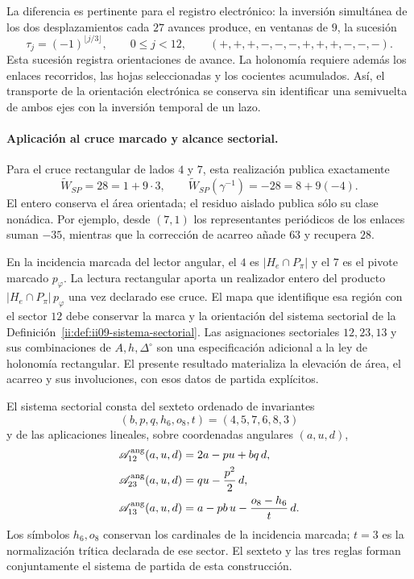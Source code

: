 La diferencia es pertinente para el registro electrónico: la inversión
simultánea de los dos desplazamientos cada $27$ avances produce, en
ventanas de $9$, la sucesión
\[
 \tau_j=(-1)^{\lfloor j/3\rfloor},\qquad 0\leq j<12,
 \qquad (+,+,+,-,-,-,+,+,+,-,-,-).
\]
Esta sucesión registra orientaciones de avance. La holonomía requiere
además los enlaces recorridos, las hojas seleccionadas y los cocientes
acumulados. Así, el transporte de la orientación electrónica se conserva
sin identificar una semivuelta de ambos ejes con la inversión temporal
de un lazo.

\paragraph{Aplicación al cruce marcado y alcance sectorial.}
Para el cruce rectangular de lados $4$ y $7$, esta realización publica
exactamente
\[
 \widetilde W_{SP}=28=1+9\cdot3,\qquad
 \widetilde W_{SP}(\gamma^{-1})=-28=8+9(-4).
\]
El entero conserva el área orientada; el residuo aislado publica sólo
su clase nonádica. Por ejemplo, desde $(7,1)$ los representantes
periódicos de los enlaces suman $-35$, mientras que la corrección de
acarreo añade $63$ y recupera $28$.

En la incidencia marcada del lector angular, el $4$ es
$|H_e\cap P_\pi|$ y el $7$ es el pivote marcado $p_\varphi$.
La lectura rectangular aporta un realizador entero del producto
$|H_e\cap P_\pi|\,p_\varphi$ una vez declarado ese cruce. El
mapa que identifique esa región con el sector $12$ debe conservar
la marca y la orientación del sistema sectorial de
la Definición~\ref{ii:def:ii09-sistema-sectorial}. Las asignaciones
sectoriales $12,23,13$ y sus combinaciones de $A,h,\Delta^\circ$
son una especificación adicional a la ley de holonomía rectangular.
El presente resultado materializa la elevación de área, el acarreo y
sus involuciones, con esos datos de partida explícitos.



\begin{definition}
\label{ii:def:ii09-sistema-sectorial}
El sistema sectorial consta del sexteto ordenado de invariantes
\[
 (b,p,q,h_6,o_8,t)=(4,5,7,6,8,3)
\]
y de las aplicaciones lineales, sobre coordenadas angulares
\((a,u,d)\),
\begin{align}
 \mathscr A_{12}^{\rm ang}(a,u,d)&=2a-pu+bq\,d,\label{ii:eq:ii09-sector12}\\
 \mathscr A_{23}^{\rm ang}(a,u,d)&=qu-\frac{p^2}{2}\,d,\label{ii:eq:ii09-sector23}\\
 \mathscr A_{13}^{\rm ang}(a,u,d)&=a-pb\,u-\frac{o_8-h_6}{t}\,d.
 \label{ii:eq:ii09-sector13}
\end{align}
Los símbolos \(h_6,o_8\) conservan los cardinales de la incidencia
marcada; \(t=3\) es la normalización trítica declarada de ese sector.
El sexteto y las tres reglas forman conjuntamente el sistema de
partida de esta construcción.
\end{definition}

